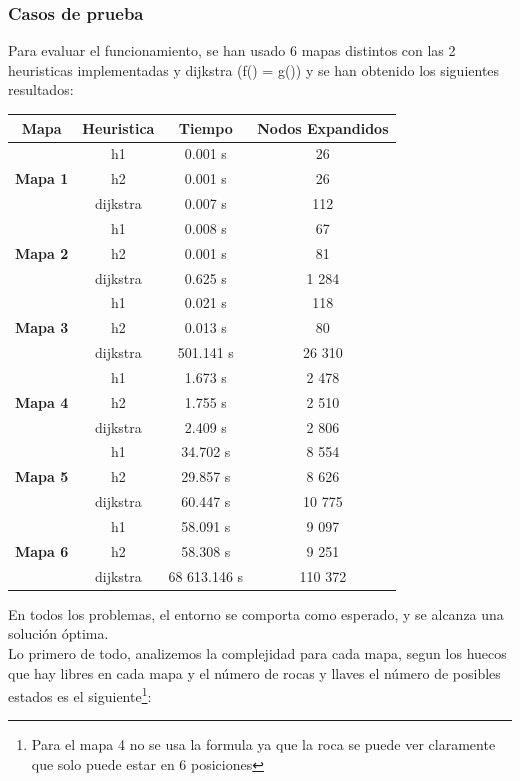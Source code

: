 \documentclass[11pt,spanish]{article}
\begin{document}
		\subsubsection{Casos de prueba}
			Para evaluar el funcionamiento, se han usado 6 mapas distintos con las 2 heuristicas implementadas y dijkstra (f() = g()) y se han obtenido los siguientes resultados:\\
			\begin{center}
			\begin{tabular}{|c||c|c|c|}
				\hline
				\textbf{Mapa}&\textbf{Heuristica}&\textbf{Tiempo}&\textbf{Nodos Expandidos}\\
				\hline
				\hline
				\multirow{3}{*}{\textbf{Mapa 1}} & h1 & 0.001 s & 26\\
												& h2 & 0.001 s & 26\\
												& dijkstra & 0.007 s & 112\\
				\hline
				\multirow{3}{*}{\textbf{Mapa 2}} & h1 & 0.008 s & 67\\
												& h2 & 0.001 s & 81\\
												& dijkstra & 0.625 s & 1 284\\
				\hline
				\multirow{3}{*}{\textbf{Mapa 3}} & h1 & 0.021 s & 118\\
												& h2 & 0.013 s & 80\\
												& dijkstra & 501.141 s & 26 310\\
				\hline
				\multirow{3}{*}{\textbf{Mapa 4}} & h1 & 1.673 s & 2 478\\
												& h2 & 1.755 s & 2 510\\
												& dijkstra & 2.409 s & 2 806\\
				\hline
				\multirow{3}{*}{\textbf{Mapa 5}} & h1 & 34.702 s & 8 554\\
												& h2 & 29.857 s & 8 626\\
												& dijkstra & 60.447 s & 10 775\\
				\hline
				\multirow{3}{*}{\textbf{Mapa 6}} & h1 & 58.091 s & 9 097\\
												& h2 & 58.308 s & 9 251\\
												& dijkstra & 68 613.146 s & 110 372\\
				\hline
			\end{tabular}
			\end{center}
			En todos los problemas, el entorno se comporta como esperado, y se alcanza una solución óptima.
			\\
			Lo primero de todo, analizemos la complejidad para cada mapa, segun los huecos que hay libres en cada mapa y el número de rocas y llaves el número de posibles estados es el siguiente\footnote{Para el mapa 4 no se usa  la formula ya que la roca se puede ver claramente que solo puede estar en 6 posiciones}:
\end{document}
